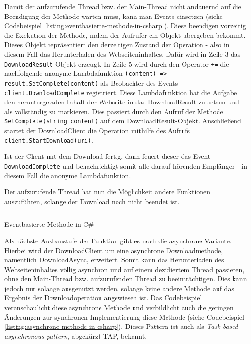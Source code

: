 Damit der aufzurufende Thread bzw. der Main-Thread nicht andauernd auf die Beendigung der Methode warten muss, kann man Events einsetzen (siehe Codebeispiel \ref{listing:eventbasierte-methode-in-csharp}). Diese beendigen vorzeitig die Exekution der Methode, indem der Aufrufer ein Objekt übergeben bekommt. Dieses Objekt repräsentiert den derzeitigen Zustand der Operation - also in diesem Fall das Herunterladen des Webseiteninhaltes. Dafür wird in Zeile 3 das \texttt{DownloadResult}-Objekt erzeugt. In Zeile 5 wird durch den Operator \texttt{+=} die nachfolgende anonyme Lambdafunktion \texttt{(content) => result.SetComplete(content)} als Beobachter des Events \texttt{client.DownloadComplete} registriert. Diese Lambdafunktion hat die Aufgabe den heruntergeladen Inhalt der Webseite in das DownloadResult zu setzen und als vollständig zu markieren. Dies passiert durch den Aufruf der Methode \texttt{SetComplete(string content)} auf dem DownloadResult-Objekt. Anschließend startet der DownloadClient die Operation mithilfe des Aufrufs \texttt{client.StartDownload(uri)}.

Ist der Client mit dem Download fertig, dann feuert dieser das Event \texttt{DownloadComplete} und benachrichtigt somit alle darauf hörenden Empfänger - in diesem Fall die anonyme Lambdafunktion.

Der aufzurufende Thread hat nun die Möglichkeit andere Funktionen auszuführen, solange der Download noch nicht beendet ist.

\begin{listing}[H]
    \inputminted[framesep=2mm, baselinestretch=1.2, fontsize=\normalsize, linenos]{csharp}{codes/example_eventbased.cs}
    \caption{Eventbasierte Methode in C\#}
    \label{listing:eventbasierte-methode-in-csharp}
\end{listing}

Als nächste Ausbaustufe der Funktion gibt es noch die asynchrone Variante. Hierbei wird der DownloadClient um eine asynchrone Downloadmethode, namentlich DownloadAsync, erweitert. Somit kann das Herunterladen des Webseiteninhaltes völlig asynchron und auf einem dezidiertem Thread passieren, ohne den Main-Thread bzw. aufzurufenden Thread zu beeinträchtigen. Dies kann jedoch nur solange ausgenutzt werden, solange keine andere Methode auf das Ergebnis der Downloadoperation angewiesen ist. Das Codebeispiel veranschaulicht diese asynchrone Methode und verbildlicht auch die geringen Änderungen zur synchronen Implementierung diese Methode (siehe Codebeispiel \ref{listing:asynchrone-methode-in-csharp}). Dieses Pattern ist auch als \textit{Task-based asynchronous pattern}, abgekürzt TAP, bekannt.

